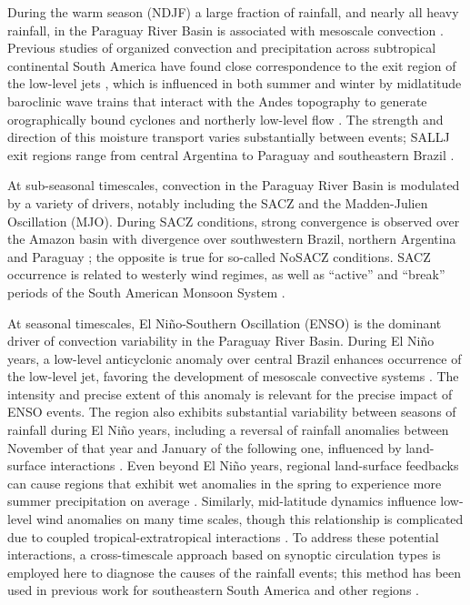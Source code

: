 \documentclass[twocol]{ametsoc}
\begin{document}
During the warm season (NDJF) a large fraction of rainfall, and nearly all heavy rainfall, in the Paraguay River Basin is associated with mesoscale convection \citep{Velasco1987}.
Previous studies of organized convection and precipitation across subtropical continental South America have found close correspondence to the exit region of the low-level jets \citep{Saulo:2007km,Salio:2007gd,Marengo2004,Velasco1987}, which is influenced in both summer and winter by midlatitude baroclinic wave trains that interact with the Andes topography to generate orographically bound cyclones and northerly low-level flow \citep{Campetella:2002hx,Seluchi:2006bi,Boers:2014gt}.
The strength and direction of this moisture transport varies substantially between events; SALLJ exit regions range from central Argentina \citep[``Chaco Jet Events'';][]{Salio:2002ev} to Paraguay and southeastern Brazil \citep[``No-Chaco Jet Events'';][]{Vera:2006ib}.

At sub-seasonal timescales, convection in the Paraguay River Basin is modulated by a variety of drivers, notably including the SACZ and the Madden-Julien Oscillation (MJO).
During SACZ conditions, strong convergence is observed over the Amazon basin with divergence over southwestern Brazil, northern Argentina and Paraguay \citep{Herdies:2002jy,Carvalho2010}; the opposite is true for so-called NoSACZ conditions.
SACZ occurrence is related to westerly wind regimes, as well as ``active'' and ``break'' periods of the South American Monsoon System \citep{Marengo2004}.

At seasonal timescales, El Ni\~no-Southern Oscillation (ENSO) is the dominant driver of convection variability in the Paraguay River Basin.
During El Ni\~no years, a low-level anticyclonic anomaly over central Brazil enhances occurrence of the low-level jet, favoring the development of mesoscale convective systems \citep{Velasco1987}.
The intensity and precise extent of this anomaly is relevant for the precise impact of ENSO events.
The region also exhibits substantial variability between seasons of rainfall during El Ni\~no years, including a reversal of rainfall anomalies between November of that year and January of the following one, influenced by land-surface interactions \citep{Grimm2009,Grimm2003}.
Even beyond El Ni\~no years, regional land-surface feedbacks can cause regions that exhibit wet anomalies in the spring to experience more summer precipitation on average \citep{Grimm:2009bq}.
Similarly, mid-latitude dynamics influence low-level wind anomalies on many time scales, though this relationship is complicated due to coupled tropical-extratropical interactions \citep{Carvalho2004,Jones2002}.
To address these potential interactions, a cross-timescale approach based on synoptic circulation types is employed here to diagnose the causes of the rainfall events; this method has been used in previous work for southeastern South America \citep{Munoz2015,Munoz2016} and other regions \citep{Moron2015}.
\end{document}
